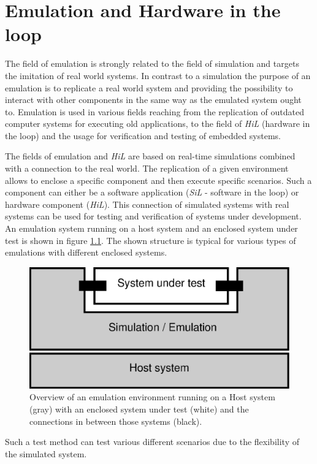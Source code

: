 \chapter{Emulation and Hardware in the loop}
\label{cha:emulation}

The field of emulation is strongly related to the field of simulation and targets the imitation of real world systems.
In contrast to a simulation the purpose of an emulation is to replicate a real world system and providing the possibility to interact with other components in the same way as the emulated system ought to.
Emulation is used in various fields reaching from the replication of outdated computer systems for executing old applications, to the field of \emph{HiL} (hardware in the loop) and the usage for verification and testing of embedded systems. \cite{emulation_koninklijke}

The fields of emulation and \emph{HiL} are based on real-time simulations combined with a connection to the real world.
The replication of a given environment allows to enclose a specific component and then execute specific scenarios.
Such a component can either be a software application (\emph{SiL} - software in the loop) or hardware component (\emph{HiL}).
This connection of simulated systems with real systems can be used for testing and verification of systems under development.
An emulation system running on a host system and an enclosed system under test is shown in figure \ref{fig:emulation_overview}.
The shown structure is typical for various types of emulations with different enclosed systems.

\begin{figure}
\centering
\includegraphics[width=0.7\linewidth]{images/emulation_overview}
\caption{Overview of an emulation environment running on a Host system (gray) with an enclosed system under test (white) and the connections in between those systems (black).}
\label{fig:emulation_overview}
\end{figure}



Such a test method can test various different scenarios due to the flexibility of the simulated system.
\cite[section I]{lu_low-cost_2007}

